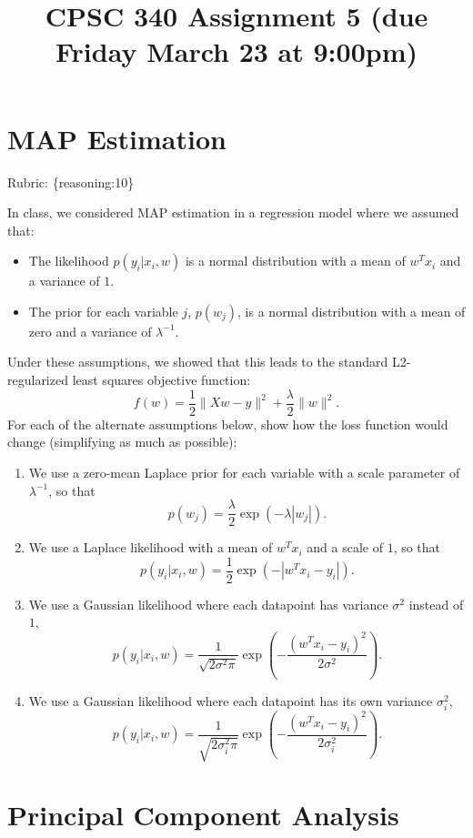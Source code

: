 \documentclass{article}
\def\rubric#1{\gre{Rubric: \{#1\}}}{}
\def\blu#1{{\color{blu}#1}}
\def\gre#1{{\color{gre}#1}}
\def\norm#1{\|#1\|}
\def\items#1{\begin{itemize}#1\end{itemize}}
\def\enum#1{\begin{enumerate}#1\end{enumerate}}
\begin{document}
\title{CPSC 340 Assignment 5 (due Friday March 23 at 9:00pm)}
\date{}
\maketitle

\vspace{-7em}

\vspace{1em}


\section{MAP Estimation}
\rubric{reasoning:10}

In class, we considered MAP estimation in a regression model where we assumed that:
\items{
\item The likelihood $p(y_i | x_i, w)$ is a normal distribution with a mean of $w^Tx_i$ and a variance of $1$.
\item The prior for each variable $j$, $p(w_j)$, is a normal distribution with a mean of zero and a variance of $\lambda^{-1}$.
}
Under these assumptions, we showed that this leads to the standard L2-regularized least squares objective function:
\[
f(w) = \frac{1}{2}\norm{Xw - y}^2 + \frac \lambda 2 \norm{w}^2.
\]
\blu{For each of the alternate assumptions below, show how the loss function would change} (simplifying as much as possible):
\enum{
\item We use a zero-mean Laplace prior for each variable with a scale parameter of $\lambda^{-1}$, so that
\[
p(w_j) = \frac{\lambda}{2}\exp(-\lambda|w_j|).
\]
\item We use a Laplace likelihood with a mean of $w^Tx_i$ and a scale of $1$, so that
\[
p(y_i | x_i, w) = \frac 1 2 \exp(-|w^Tx_i - y_i|).
\]
\item We use a Gaussian likelihood where each datapoint has variance $\sigma^2$ instead of $1$,
\[
p(y_i | x_i,w) = \frac{1}{\sqrt{2\sigma^2\pi}}\exp\left(-\frac{(w^Tx_i - y_i)^2}{2\sigma^2}\right).
\]
\item We use a Gaussian likelihood where each datapoint has its own variance $\sigma_i^2$,
\[
p(y_i | x_i,w) = \frac{1}{\sqrt{2\sigma_i^2\pi}}\exp\left(-\frac{(w^Tx_i - y_i)^2}{2\sigma_i^2}\right).
\]
}









\section{Principal Component Analysis}
\end{document}

